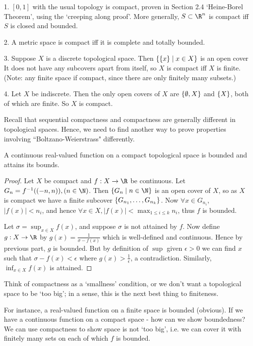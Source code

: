 \begin{example}

1. $[0,1]$ with the usual topology is compact, proven in Section 2.4 `Heine-Borel Theorem', using the `creeping along proof'. More generally, $S\subset \R^n$ is compact iff $S$ is closed and bounded.

2. A metric space is compact iff it is complete and totally bounded.

3. Suppose $X$ is a discrete topological space. Then $\{\{x\}\mid x\in X\}$ is an open cover It does not have any subcovers apart from itself, so $X$ is compact iff $X$ is finite. (Note: any finite space if compact, since there are only finitely many subsets.)

4. Let $X$ be indiscrete. Then the only open covers of $X$ are $\{\emptyset, X\}$ and $\{X\}$, both of which are finite. So $X$ is compact.

\end{example}

Recall that sequential compactness and compactness are generally different in topological spaces. Hence, we need to find another way to prove properties involving ``Boltzano-Weierstrass" differently.
\begin{theorem}                           %
A continuous real-valued function on a compact topological space is bounded and attains its bounds.
\end{theorem}   

\begin{proof}
Let $X$ be compact and $f:X \to \R$ be continuous. Let $G_n = f\inv((-n,n)) , (n\in \N)$. Then $\Set{G_n}{n\in \N}$ is an open cover of $X$, so as $X$ is compact we have a finite subcover $\{G_{n_1},\dots, G_{n_k}\}$. Now $\forall x\in G_{n_i}$, $|f(x)| < n_i$, and hence $\forall x\in X, |f(x)| < \max_{1 \leq i  \leq k} n_i$, thus $f$ is bounded.

Let $\sigma = \sup_{x\in X} f(x)$, and suppose $\sigma$ is not attained by $f$. Now define $g: X \to \R$ by $g(x) = \frac{1}{\sigma-f(x)}$ which is well-defined and continuous. Hence by previous part, $g$ is bounded. But by definition of $\sup$ given $\epsilon>0$ we can find $x$ such that $\sigma - f(x)< \epsilon$ where $g(x) > \frac{1}{\epsilon}$, a contradiction. Similarly, $\inf_{x\in X} f(x)$ is attained.
\end{proof}

\begin{remark}
Think of compactness as a `smallness' condition, or we don't want a topological space to be `too big'; in a sense, this is the next best thing to finiteness.

For instance, a real-valued function on a finite space is bounded (obvious). If we have a continuous function on a compact space - how can we show boundedness? We can use compactness to show space is not `too big', i.e. we can cover it with finitely many sets on each of which $f$ is bounded.
\end{remark}
    
